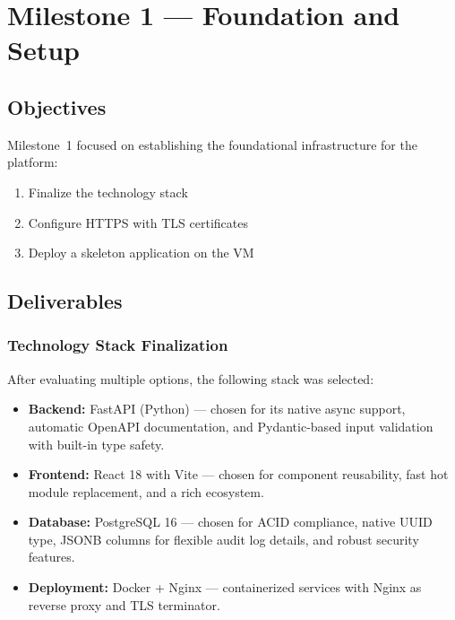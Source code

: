 
\section{Milestone 1 — Foundation and Setup}
\label{sec:milestone1}

\subsection{Objectives}

Milestone~1 focused on establishing the foundational infrastructure for the platform:

\begin{enumerate}
    \item Finalize the technology stack
    \item Configure HTTPS with TLS certificates
    \item Deploy a skeleton application on the VM
\end{enumerate}

\subsection{Deliverables}

\subsubsection{Technology Stack Finalization}

After evaluating multiple options, the following stack was selected:

\begin{itemize}
    \item \textbf{Backend:} FastAPI (Python) — chosen for its native async support, automatic OpenAPI documentation, and Pydantic-based input validation with built-in type safety.
    \item \textbf{Frontend:} React 18 with Vite — chosen for component reusability, fast hot module replacement, and a rich ecosystem.
    \item \textbf{Database:} PostgreSQL 16 — chosen for ACID compliance, native UUID type, JSONB columns for flexible audit log details, and robust security features.
    \item \textbf{Deployment:} Docker + Nginx — containerized services with Nginx as reverse proxy and TLS terminator.
\end{itemize}

